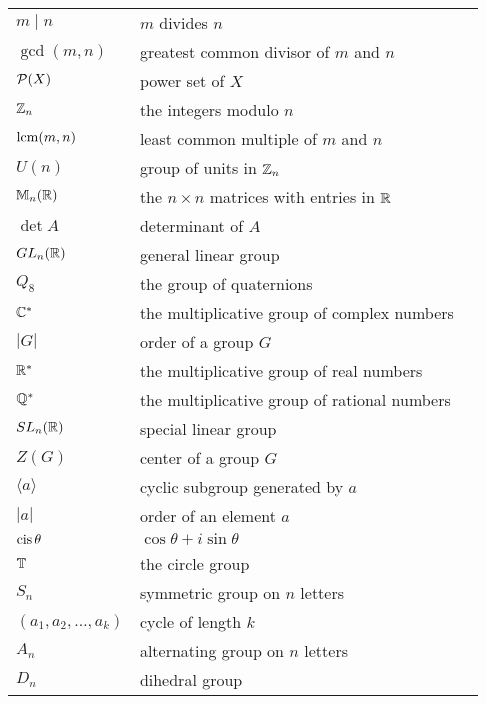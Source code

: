 \begin{center}
\begin{longtable}{llr}
%
$m \mid n$ & $m$ divides $n$ & \pageref{divides} \\
%
$\gcd(m, n)$ & greatest common divisor of $m$ and $n$ & \pageref{greatestcd}\\
%
${\cal P}(X)$ & power set of $X$ & \pageref{powerset} \\
%
${\Bbb Z}_n$ & the integers modulo $n$ & \pageref{integersmodn} \\
%
$\operatorname{lcm}(m,n)$ & least common multiple of $m$ and $n$ & \pageref{leastcm} \\
%
$U(n)$ & group of units in ${\Bbb Z}_n$ & \pageref{groupofunits} \\
%
${\Bbb M}_n ( {\Bbb R})$ & the $n \times n$ matrices with entries in ${\Bbb R}$ &  \pageref{notematrices} \\
%
$\det A$ & determinant of $A$ & \pageref{determinant} \\
%
$GL_n({\Bbb R})$ & general linear group & \pageref{generallinear} \\
%
$Q_8$ & the group of quaternions & \pageref{notequateriongroup} \\
%
${\Bbb C}^\ast$ & the multiplicative group of complex numbers & \pageref{noteCstar} \\
%
$|G|$ & order of a group $G$ & \pageref{noteorder} \\
%
${\Bbb R}^*$ & the multiplicative group of real numbers & \pageref{noteRstar} \\
%
${\Bbb Q}^*$ & the multiplicative group of rational numbers & \pageref{noteQstar} \\
%
$SL_n({\Bbb R})$ & special linear group & \pageref{speciallinear} \\
%
$Z(G)$ & center of a group $G$ & \pageref{centerofagroup} \\
%
$\langle a \rangle$ & cyclic subgroup generated by $a$ & \pageref{generatedby} \\
%
$|a|$ & order of an element $a$ & \pageref{noteelementorder} \\
%
$\operatorname{cis} \theta$ & $\cos \theta + i \sin \theta$ & \pageref{cosisin} \\
%
${\Bbb T}$ & the circle group & \pageref{notecirclegroup} \\
%
$S_n$ & symmetric group on $n$ letters & \pageref{symmetricgroup} \\
%
$(a_1, a_2, \ldots, a_k )$ & cycle of length $k$ & \pageref{notecycle} \\
%
$A_n$ & alternating group on $n$ letters & \pageref{alternatinggroup} \\
%
$D_n$ & dihedral group & \pageref{dihedralgroup} \\

\end{longtable}
\end{center}

